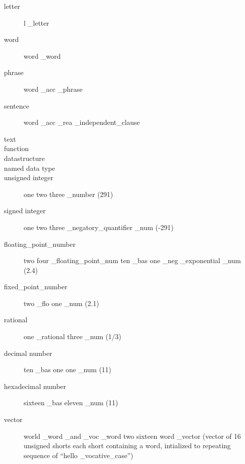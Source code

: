 %
\begin{description}
  \item[letter] l \_letter
  \item[word] word \_word
  \item[phrase] word \_acc \_phrase
  \item[sentence] word \_acc \_rea \_independent\_clause
  \item[text] 
  \item[function]
  \item[datastructure]
  \item[named data type]
  \item[unsigned integer] one two three \_number (291)
  \item[signed integer] one two three \_negatory\_quantifier \_num
(-291)
  \item[floating\_point\_number] two four \_floating\_point\_num ten \_bas
one \_neg \_exponential \_num (2.4)
  \item[fixed\_point\_number] two \_flo one \_num (2.1)
  \item[rational] one \_rational three \_num (1/3)
  \item[decimal number] ten \_bas  one one \_num (11)
  \item[hexadecimal number] sixteen \_bas eleven \_num (11)
  \item[vector] world \_word \_and \_voc \_word two sixteen word \_vector (vector of 16
unsigned shorts each short containing a word, intialized to repeating sequence
of ``hello \_vocative\_case'')
\end{description}

